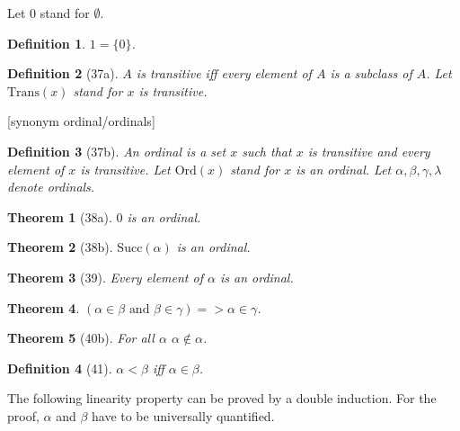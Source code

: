 \documentclass{article}
\newenvironment{forthel}{\begin{leftbar}}{\end{leftbar}}
\newtheorem{theorem}{Theorem}
\newtheorem{definition}{Definition}
\begin{document}
\begin{forthel}
Let 0 stand for $\emptyset$.
\begin{definition} $1 = \{0\}$. \end{definition}

\begin{definition}[37a] $A$ is \emph{transitive} iff 
every element of $A$ is a subclass of $A$.
Let $\mathrm{Trans}(x)$ stand for $x$ is transitive.
\end{definition}

[synonym ordinal/ordinals]

\begin{definition}[37b] An \emph{ordinal} is a set $x$ such that
$x$ is transitive and every element of $x$ is transitive.
Let $\mathrm{Ord}(x)$ stand for $x$ is an ordinal.
Let $\alpha, \beta, \gamma, \lambda$ denote ordinals.
\end{definition}

\begin{theorem}[38a] $0$ is an ordinal.\end{theorem}

\begin{theorem}[38b] $\mathrm{Succ}(\alpha)$ is an ordinal. \end{theorem}

\begin{theorem}[39] Every element of $\alpha$ is an ordinal.
\end{theorem}

\begin{theorem} $(\alpha \in \beta \text{ and } \beta \in \gamma) => \alpha \in \gamma$.
\end{theorem}

\begin{theorem}[40b] For all $\alpha$ $\alpha \notin \alpha$.
\end{theorem}

\begin{definition}[41] $\alpha < \beta$ iff $\alpha \in \beta$.
\end{definition}
\end{forthel}
The following linearity property can be proved by a double induction.
For the proof, $\alpha$ and $\beta$ have to be universally quantified.
\end{document}
